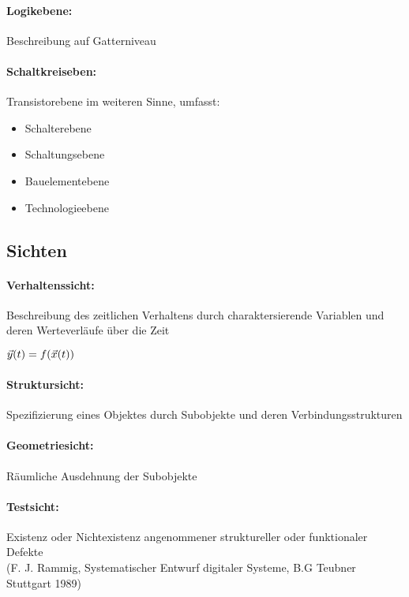 	\paragraph{Logikebene:} Beschreibung auf Gatterniveau
	\paragraph{Schaltkreiseben:} Transistorebene im weiteren Sinne, umfasst:
		\begin{itemize}
			\item Schalterebene
			\item Schaltungsebene
			\item Bauelementebene
			\item Technologieebene
		\end{itemize}

\subsection{Sichten}
	\paragraph{Verhaltenssicht:} Beschreibung des zeitlichen Verhaltens durch charaktersierende Variablen und deren Werteverläufe über die Zeit
		
		\begin{center}
			\boldmath\( \mathlarger{\vec{y}(t) = f(\vec{x}(t))} \)
		\end{center}
	\paragraph{Struktursicht:} Spezifizierung eines Objektes durch Subobjekte und deren Verbindungsstrukturen
	
	\paragraph{Geometriesicht:} Räumliche Ausdehnung der Subobjekte
	
	\paragraph{Testsicht:} Existenz oder Nichtexistenz angenommener struktureller oder funktionaler Defekte \\(F. J. Rammig, Systematischer Entwurf digitaler Systeme, B.G Teubner Stuttgart 1989)
	
